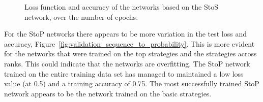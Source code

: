 \begin{figure}[!htbp]
\begin{subfigure}{\textwidth}
    \end{subfigure}
    \caption{Loss function and accuracy of the networks based on the StoS network,
    over the number of epochs.}\label{fig:validation_sequence_to_sequence}
\end{figure}

For the StoP networks there appears to be more variation in the test loss and
accuracy, Figure~\ref{fig:validation_sequence_to_probability}. This is more evident
for the networks that were trained on the top strategies and the strategies
across ranks. This could indicate that the networks are overfitting. The StoP
network trained on the entire training data set has managed to maintained
a low loss value (at 0.5) and a training accuracy of 0.75. The most successfully
trained StoP network appears to be the network trained on the basic strategies.

